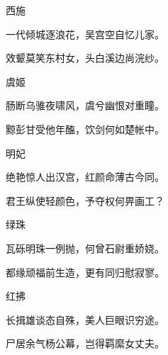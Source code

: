 \begin{poem}
    \begin{pl}西施
    \end{pl}


    \begin{pl}一代倾城逐浪花，吴宫空自忆儿家。
    \end{pl}


    \begin{pl}效颦莫笑东村女，头白溪边尚浣纱。
    \end{pl}
    \emptypl

    \begin{pl}虞姬
    \end{pl}


    \begin{pl}肠断乌骓夜啸风，虞兮幽恨对重瞳。
    \end{pl}


    \begin{pl}黥彭甘受他年醢，饮剑何如楚帐中。
    \end{pl}
    \emptypl

    \begin{pl}明妃
    \end{pl}


    \begin{pl}绝艳惊人出汉宫，红颜命薄古今同。
    \end{pl}


    \begin{pl}君王纵使轻颜色，予夺权何畀画工？
    \end{pl}
    \emptypl

    \begin{pl}绿珠
    \end{pl}


    \begin{pl}瓦砾明珠一例抛，何曾石尉重娇娆。
    \end{pl}


    \begin{pl}都缘顽福前生造，更有同归慰寂寥。
    \end{pl}
    \emptypl

    \begin{pl}红拂
    \end{pl}


    \begin{pl}长揖雄谈态自殊，美人巨眼识穷途。
    \end{pl}


    \begin{pl}尸居余气杨公幕，岂得羁縻女丈夫。
    \end{pl}


\end{poem}


